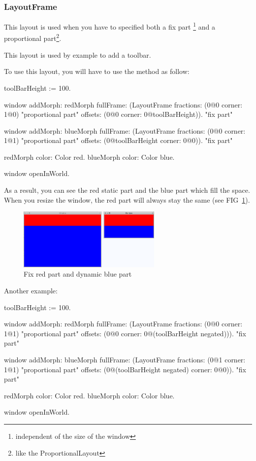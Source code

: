 \documentclass[a4paper,10pt,twoside]{book}
\begin{document}
\subsubsection{LayoutFrame}

This layout is used when you have to specified both a fix part \footnote{independent of the size of the window} and a proportional part\footnote{like the ProportionalLayout}.

This layout is used by example to add a toolbar.

To use this layout, you will have to use the method  as follow:

\begin{code}{}
toolBarHeight := 100.

window
	addMorph: redMorph
	fullFrame: (LayoutFrame
				fractions: (0@0 corner: 1@0) "proportional part"
				offsets: (0@0 corner: 0@toolBarHeight)). "fix part"

window
	addMorph: blueMorph
	fullFrame: (LayoutFrame
				fractions: (0@0 corner: 1@1) "proportional part"
				offsets: (0@toolBarHeight corner: 0@0)). "fix part"

redMorph color: Color red.
blueMorph color: Color blue.
	
window openInWorld.
\end{code}

As a result, you can see the red static part and the blue part which fill the space. When you resize the window, the red part will always stay the same (see FIG~\ref{fig:layoutFrame}).

\begin{figure}[ht]\centering
	\includegraphics[width=7cm]{LayoutFrame}
	\caption{Fix red part and dynamic blue part}
	\label{fig:layoutFrame}
\end{figure}

Another example:
\begin{code}{}
toolBarHeight := 100.

window
	addMorph: redMorph
	fullFrame: (LayoutFrame
				fractions: (0@0 corner: 1@1) "proportional part"
				offsets: (0@0 corner: 0@(toolBarHeight negated))). "fix part"

window
	addMorph: blueMorph
	fullFrame: (LayoutFrame
				fractions: (0@1 corner: 1@1) "proportional part"
				offsets: (0@(toolBarHeight negated) corner: 0@0)). "fix part"

redMorph color: Color red.
blueMorph color: Color blue.
	
window openInWorld.
\end{code}
\end{document}
